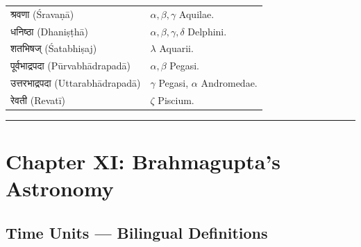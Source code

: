 \documentclass[11pt,a4paper]{article}
\newcommand{\longline}{\noindent\rule{\textwidth}{0.4pt}}
\newcommand{\dev}[1]{{\devanagarifont #1}}
\theoremstyle{definition}
\begin{document}
\begin{longtable}{p{}p{}}
\dev{श्रवणा} (\'{S}rava\d{n}\={a}) & $\alpha, \beta, \gamma$ Aquilae. \\
\dev{धनिष्ठा} (Dhani\d{s}\d{t}h\={a}) & $\alpha, \beta, \gamma, \delta$ Delphini. \\
\dev{शतभिषज्} ({\'{S}}atabhi\d{s}aj) & $\lambda$ Aquarii. \\
\dev{पूर्वभाद्रपदा} (P\={u}rvabh\=adrapad\={a}) & $\alpha, \beta$ Pegasi. \\
\dev{उत्तरभाद्रपदा} (Uttarabh\=adrapad\={a}) & $\gamma$ Pegasi, $\alpha$ Andromedae. \\
\dev{रेवती} (Revat\={i}) & $\zeta$ Piscium. \\
\bottomrule
\end{longtable}

\longline

\section{Chapter XI: Brahmagupta's Astronomy}
\label{sec:astronomy}

\subsection*{Time Units --- Bilingual Definitions}
\end{document}
